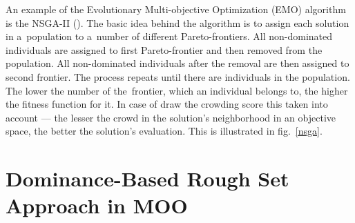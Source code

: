 An example of the Evolutionary Multi-objective Optimization (EMO) algorithm is
the NSGA-II (\cite{Deb00}). The basic idea behind the algorithm is to assign
each solution in a~population to a~number of different Pareto-frontiers. All
non-dominated individuals are assigned to first Pareto-frontier and then
removed from the population. All non-dominated individuals after the removal
are then assigned to second frontier. The process repeats until there are
individuals in the population. The lower the number of the~frontier, which an
individual belongs to, the higher the fitness function for it. In case of draw
the crowding score this taken into account --- the lesser the crowd in the
solution's neighborhood in an objective space, the better the solution's
evaluation. This is illustrated in fig.~\ref{nsga}.


\section{Dominance-Based Rough Set Approach in MOO}
\label{sec_drsa_in_moo}


